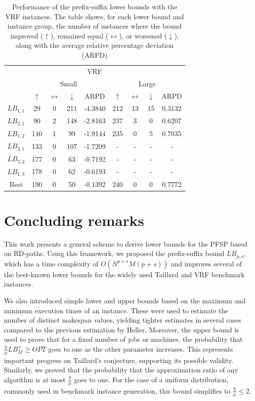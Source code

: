 \documentclass{article}
\theoremstyle{thmstyleone}%
\theoremstyle{thmstyletwo}%
\theoremstyle{thmstylethree}%
\begin{document}
\begin{table}[]
\centering
\begin{tabular}{c|cccc|cccc|}
\multicolumn{9}{c}{VRF} \\ 
\multirow{2}{*}{} & \multicolumn{4}{c|}{Small}                            & \multicolumn{4}{c|}{Large}                            \\ \hline
                  & $\uparrow$ & $\leftrightarrow$ & $\downarrow$ & ARPD & $\uparrow$ & $\leftrightarrow$ & $\downarrow$ & ARPD \\
$LB_{1,1}$ & 29 & 0 & 211 & -4.3840 & 212 & 13 & 15 & 0.3132\\
$LB_{2,1}$ & 90 & 2 & 148 & -2.8163 & 237 & 3 & 0 & 0.6207\\
$LB_{1,2}$ & 140 & 1 & 99 & -1.9144 & 235 & 0 & 5 & 0.7035\\
$LB_{3,1}$ & 133 & 0 & 107 & -1.7209 & - & - & - & -\\
$LB_{2,2}$ & 177 & 0 & 63 & -0.7192 & - & - & - & -\\
$LB_{1,3}$ & 178 & 0 & 62 & -0.6193 & - & - & - & -\\ \hline
Best & 190 & 0  & 50 & -0.1392 & 240 & 0 & 0  & 0.7772 \\ \hline
\end{tabular}
    \caption{Performance of the prefix-suffix lower bounds with the VRF instances. The table shows, for each lower bound and instance group, the number of instances where the bound improved ($\uparrow$), remained equal ($\leftrightarrow$), or worsened ($\downarrow$), along with the average relative percentage deviation (ARPD)}
    \label{Table:PerformanceLBVRF}
\end{table}



\section{Concluding remarks}
\label{section:Conclusion}

This work presents a general scheme to derive lower bounds for the PFSP based on RD-paths. 
Using this framework, we proposed the prefix-suffix bound $LB_{p, s}$, which has a time complexity of $O(N^{p  + s}M(p + s))$ and improves several of the best-known lower bounds for the widely used Taillard and VRF benchmark instances.

We also introduced simple lower and upper bounds based on the maximum and minimum execution times of an instance.  
These were used to estimate the number of distinct makespan values, yielding tighter estimates in several cases compared to the previous estimation by Heller.   
Moreover, the upper bound is used to prove that for a fixed number of jobs or machines, the probability that $\frac{b}{\mu} LB_M^+ \geq OPT$ goes to one as the other parameter increases. 
This represents important progress on Taillard's conjecture, supporting its possible validity. 
Similarly, we proved that the probability that the approximation ratio of any algorithm is at most $\frac{b}{\mu}$ goes to one. 
For the case of a uniform distribution, commonly used in benchmark instance generation, this bound simplifies to $\frac{b}{\mu} \leq 2$. 
\end{document}
